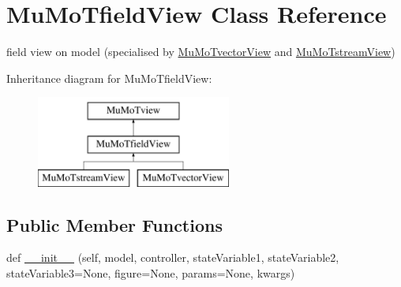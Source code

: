 \hypertarget{class_mu_mo_t_1_1_mu_mo_tfield_view}{}\section{Mu\+Mo\+Tfield\+View Class Reference}
\label{class_mu_mo_t_1_1_mu_mo_tfield_view}


field view on model (specialised by \hyperlink{class_mu_mo_t_1_1_mu_mo_tvector_view}{Mu\+Mo\+Tvector\+View} and \hyperlink{class_mu_mo_t_1_1_mu_mo_tstream_view}{Mu\+Mo\+Tstream\+View})  


Inheritance diagram for Mu\+Mo\+Tfield\+View\+:\begin{figure}[H]
\begin{center}
\leavevmode
\includegraphics[height=3.000000cm]{class_mu_mo_t_1_1_mu_mo_tfield_view}
\end{center}
\end{figure}
\subsection*{Public Member Functions}
\begin{DoxyCompactItemize}
\item 
def \hyperlink{class_mu_mo_t_1_1_mu_mo_tfield_view_a78d68546a28ea07c46f5f4a44ddfa49a}{\+\_\+\+\_\+init\+\_\+\+\_\+} (self, model, controller, state\+Variable1, state\+Variable2, state\+Variable3=None, figure=None, params=None, kwargs)
\end{DoxyCompactItemize}
